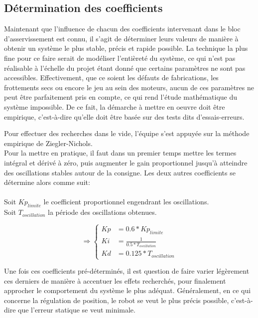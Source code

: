 \documentclass[a4paper,11pt]{article}
\begin{document}
\subsection{Détermination des coefficients\cite{le_lann_pid_2007}}

Maintenant que l'influence de chacun des coefficients intervenant dans le bloc d'asservissement est connu, il s'agit de déterminer leurs valeurs de manière à obtenir un système le plus stable, précis et rapide possible. La technique la plus fine pour ce faire serait de modéliser l'entièreté du système, ce qui n'est pas réalisable à l'échelle du projet étant donné que certains paramètres ne sont pas accessibles. Effectivement, que ce soient les défauts de fabrications, les frottements secs ou encore le jeu au sein des moteurs, aucun de ces paramètres ne peut être parfaitement pris en compte, ce qui rend l'étude mathématique du système impossible. De ce fait, la démarche à mettre en oeuvre doit être empirique, c'est-à-dire qu'elle doit être basée sur des tests dits d'essais-erreurs.

Pour effectuer des recherches dans le vide, l'équipe s'est appuyée sur la méthode empirique de Ziegler-Nichols.\\ 
Pour la mettre en pratique, il faut dans un premier temps mettre les termes intégral et dérivé à zéro, puis augmenter le gain proportionnel jusqu'à atteindre des oscillations stables autour de la consigne. Les deux autres coefficients se détermine alors comme suit:\\\\
Soit $Kp_{limite}$ le coefficient proportionnel engendrant les oscillations.\\
Soit $T_{oscillation}$ la période des oscillations obtenues.

\begin{equation*}
    \Rightarrow\left\{
        \begin{aligned}
            Kp & = 0.6*Kp_{limite}\\
            Ki & = \frac{1}{0.5*T_{oscillation}}\\
            Kd & = 0.125*T_{oscillation}
           \end{aligned}
    \right.
\end{equation*}

Une fois ces coefficients pré-déterminés, il est question de faire varier légèrement ces derniers de manière à accentuer les effets recherchés, pour finalement approcher le comportement du système le plus adéquat. Généralement, en ce qui concerne la régulation de position, le robot se veut le plus précis possible, c'est-à-dire que l'erreur statique se veut minimale.
\newline
\end{document}
